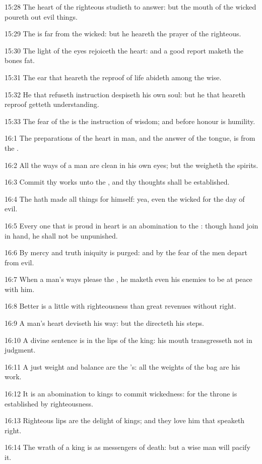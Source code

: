 15:28 The heart of the righteous studieth to answer: but the mouth of the wicked poureth out evil things.

15:29 The \LORD is far from the wicked: but he heareth the prayer of the righteous.

15:30 The light of the eyes rejoiceth the heart: and a good report maketh the bones fat.

15:31 The ear that heareth the reproof of life abideth among the wise.

15:32 He that refuseth instruction despiseth his own soul: but he that heareth reproof getteth understanding.

15:33 The fear of the \LORD is the instruction of wisdom; and before honour is humility.

16:1 The preparations of the heart in man, and the answer of the tongue, is from the \LORD.

16:2 All the ways of a man are clean in his own eyes; but the \LORD weigheth the spirits.

16:3 Commit thy works unto the \LORD, and thy thoughts shall be established.

16:4 The \LORD hath made all things for himself: yea, even the wicked for the day of evil.

16:5 Every one that is proud in heart is an abomination to the \LORD: though hand join in hand, he shall not be unpunished.

16:6 By mercy and truth iniquity is purged: and by the fear of the \LORD men depart from evil.

16:7 When a man's ways please the \LORD, he maketh even his enemies to be at peace with him.

16:8 Better is a little with righteousness than great revenues without right.

16:9 A man's heart deviseth his way: but the \LORD directeth his steps.

16:10 A divine sentence is in the lips of the king: his mouth transgresseth not in judgment.

16:11 A just weight and balance are the \LORD's: all the weights of the bag are his work.

16:12 It is an abomination to kings to commit wickedness: for the throne is established by righteousness.

16:13 Righteous lips are the delight of kings; and they love him that speaketh right.

16:14 The wrath of a king is as messengers of death: but a wise man will pacify it.

